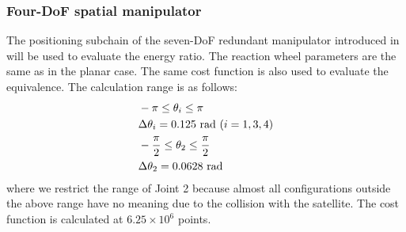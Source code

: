 \subsubsection{Four-DoF spatial manipulator}
The positioning subchain of the seven-DoF redundant manipulator introduced in 
will be used to evaluate the energy ratio.
The reaction wheel parameters are the same as in the planar case.
The same cost function is also used to evaluate the equivalence.
The calculation range is as follows:
%
\begin{align}
  &-\pi \leq \theta_{i} \leq \pi\notag\\
  &\Delta \theta_{i} = 0.125{~\mathrm{rad}}~(i = 1,3,4)\\
  &-\frac{\pi}{2} \leq \theta_{2} \leq \frac{\pi}{2}\notag\\
  &\Delta \theta_{2} = 0.0628{~\mathrm{rad}}
\end{align}
%
where  we restrict the range of Joint 2 because almost all configurations outside 
the above range have no meaning due to the collision with the satellite.
The cost function is calculated at $6.25\times 10^{6}$ points.

